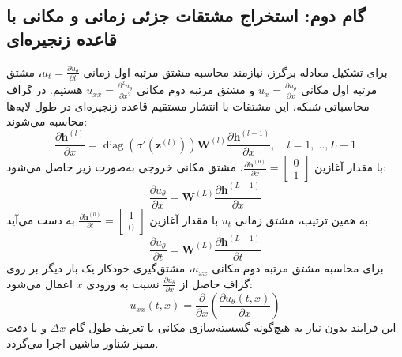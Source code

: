 \subsection{گام دوم: استخراج مشتقات جزئی زمانی و مکانی با قاعده زنجیره‌ای}
برای تشکیل معادله برگرز، نیازمند محاسبه مشتق مرتبه اول زمانی $u_t = \frac{\partial u_\theta}{\partial t}$، مشتق مرتبه اول مکانی $u_x = \frac{\partial u_\theta}{\partial x}$ و مشتق مرتبه دوم مکانی $u_{xx} = \frac{\partial^2 u_\theta}{\partial x^2}$ هستیم. در گراف محاسباتی شبکه، این مشتقات با انتشار مستقیم قاعده زنجیره‌ای در طول لایه‌ها محاسبه می‌شوند:
\begin{equation}
\frac{\partial \mathbf{h}^{(l)}}{\partial x} = \operatorname{diag}\left(\sigma'\left(\mathbf{z}^{(l)}\right)\right) \mathbf{W}^{(l)} \frac{\partial \mathbf{h}^{(l-1)}}{\partial x}, \quad l=1,\dots,L-1
\label{eq:chain-recursion}
\end{equation}
با مقدار آغازین $\frac{\partial \mathbf{h}^{(0)}}{\partial x} = \begin{bmatrix} 0 \\ 1 \end{bmatrix}$، مشتق مکانی خروجی به‌صورت زیر حاصل می‌شود:
\begin{equation}
\frac{\partial u_\theta}{\partial x} = \mathbf{W}^{(L)} \frac{\partial \mathbf{h}^{(L-1)}}{\partial x}
\label{eq:ux-chain}
\end{equation}
به همین ترتیب، مشتق زمانی $u_t$ با مقدار آغازین $\frac{\partial \mathbf{h}^{(0)}}{\partial t} = \begin{bmatrix} 1 \\ 0 \end{bmatrix}$ به دست می‌آید:
\begin{equation}
\frac{\partial u_\theta}{\partial t} = \mathbf{W}^{(L)} \frac{\partial \mathbf{h}^{(L-1)}}{\partial t}
\label{eq:ut-chain}
\end{equation}
برای محاسبه مشتق مرتبه دوم مکانی $u_{xx}$، مشتق‌گیری خودکار یک بار دیگر بر روی گراف حاصل از $\frac{\partial u_\theta}{\partial x}$ نسبت به ورودی $x$ اعمال می‌شود:
\begin{equation}
u_{xx}(t,x) = \frac{\partial}{\partial x}\left( \frac{\partial u_\theta(t,x)}{\partial x} \right)
\label{eq:uxx-def}
\end{equation}
این فرایند بدون نیاز به هیچ‌گونه گسسته‌سازی مکانی یا تعریف طول گام $\Delta x$ و با دقت ممیز شناور ماشین اجرا می‌گردد.

